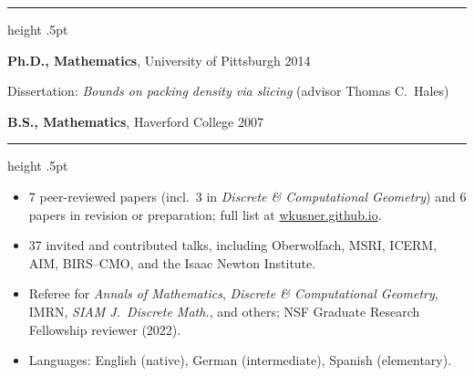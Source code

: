 \documentclass[11pt]{article}
\newcommand{\sect}[1]{\par\vspace{7pt}{\large\bfseries #1}\par\vspace{1pt}%
  {\color{rule}\hrule height .5pt}\vspace{4pt}}
\begin{document}
\sect{Education}
\textbf{Ph.D., Mathematics}, University of Pittsburgh \hfill 2014\par
Dissertation: \emph{Bounds on packing density via slicing} (advisor Thomas C.~Hales)\par
\textbf{B.S., Mathematics}, Haverford College \hfill 2007

\sect{Publications, Talks, and Professional Activity}
\begin{itemize}
  \item 7 peer-reviewed papers (incl.\ 3 in \emph{Discrete \& Computational Geometry}) and 6 papers in revision or preparation;
        full list at \href{https://wkusner.github.io}{wkusner.github.io}.
  \item 37 invited and contributed talks, including Oberwolfach, MSRI, ICERM, AIM, BIRS--CMO, and the
        Isaac Newton Institute.
  \item Referee for \emph{Annals of Mathematics}, \emph{Discrete \& Computational Geometry}, IMRN,
        \emph{SIAM J.\ Discrete Math.}, and others; NSF Graduate Research Fellowship reviewer (2022).
  \item Languages: English (native), German (intermediate), Spanish (elementary).
\end{itemize}
\end{document}

